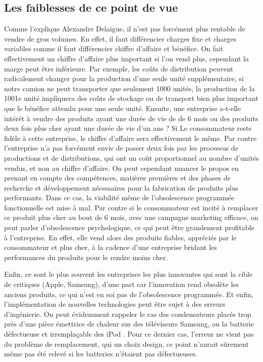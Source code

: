 \subsection{Les faiblesses de ce point de vue}


Comme l’explique Alexandre Delaigue, il n’est pas forcément plus rentable de vendre de gros volumes. En effet, il faut différencier charges fixe et charges variables comme il faut différencier chiffre d’affaire et bénéfice. On fait effectivement un chiffre d’affaire plus important si l’on vend plus, cependant la marge peut être inférieure. Par exemple,  les coûts de distribution peuvent radicalement changer pour la production d’une seule unité supplémentaire, si notre camion ne peut transporter que seulement  1000 unités,  la production de la 1001e unité impliquera des coûts de stockage ou de transport bien plus important que le bénéfice attendu pour une seule unité. Ensuite, une entreprise a-t-elle intérêt à vendre des produits ayant une durée de vie de de 6 mois ou des produits deux fois plus cher ayant une durée de vie d’un ans ? Si Le consommateur reste fidèle à cette entreprise, le chiffre d’affaire sera effectivement le même. Par contre l’entreprise n’a pas forcément envie de passer deux fois par les processus de productions et de distributions, qui ont un coût proportionnel au nombre d’unités vendus, et non au chiffre d’affaire. On peut cependant nuancer le propos en prenant en compte des compétences, matières premières  et des phases de recherche et développement nécessaires pour la fabrication de produits plus performants. Dans ce cas, la viabilité même de l’obsolescence programmée fonctionnelle est mise à mal. Par contre si le consommateur est incité à remplacer ce produit plus cher au bout de 6 mois, avec une campagne marketing efficace, on peut parler d’obsolescence psychologique, ce qui peut être grandement  profitable à l’entreprise. En effet, elle vend alors des produits fiables, appréciés par le consommateur et plus cher, à la cadence d’une entreprise bridant les performances du produits pour le rendre moins cher.

Enfin, ce sont le plus souvent les entreprises les plus innovantes qui sont la cible de critiques (Apple, Samsung), d’une part car l’innovation rend obsolète les anciens produits, ce qui n’est en soi pas de l’obsolescence programmée. Et enfin, l’implémentation de nouvelles technologies peut être sujet à des erreurs d’ingénierie. On peut évidemment rappeler le cas des condensateurs placés trop près d’une pièce émettrice de  chaleur sur des téléviseurs Samsung, ou la batterie défectueuse et irremplaçable des iPod . Pour ce dernier cas, l’erreur ne vient pas du problème de remplacement, qui un choix design, ce point n’aurait sûrement même pas été relevé si les batteries n’étaient pas défectueuses.
